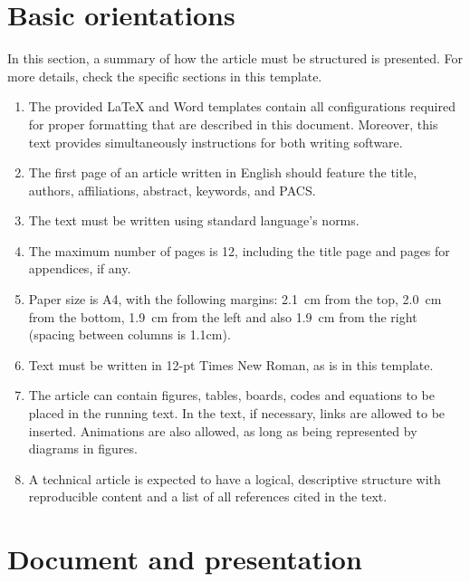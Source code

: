 \documentclass[12pt, a4paper, twoside, twocolumn]{article}
\begin{document}
\section{Basic orientations}

In this section, a summary of how the article must be structured is presented. For more details, check the specific sections in this template.

\vspace{-8pt}
\begin{enumerate} \itemsep=2pt
    \item The provided \LaTeX{} and Word templates contain all configurations required for proper formatting that are  described in this document. Moreover, this text provides simultaneously instructions for both writing software.
    \item The first page of an article written in English should feature the title, authors, affiliations, abstract, keywords, and PACS.
    \item The text must be written using  standard language's norms.
    \item The maximum number of pages is 12, including the title page and pages for appendices, if any.
    \item Paper size is A4, with the following margins: 2.1~cm from the top, 2.0~cm from the bottom, 1.9~cm from the left and also 1.9~cm from the right (spacing between columns is 1.1cm).
    \item Text must be written in 12-pt Times New Roman, as is in this template.
    \item The article can contain figures, tables, boards, codes and equations to be placed in the running text. In the text, if necessary, links are allowed to be inserted. Animations are also allowed, as long as being represented by diagrams in figures. 
    \item A technical article is expected to have a logical, descriptive structure with reproducible content and a list of all references cited in the text.
\end{enumerate}

\section{Document and presentation}
\end{document}
